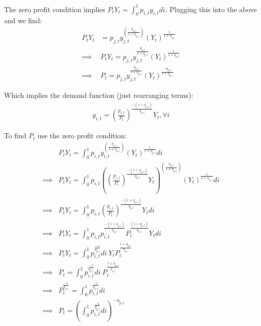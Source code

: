 \documentclass[article,11pt,letterpaper,fleqn]{article}
\theoremstyle{definition}
\numberwithin{equation}{section}
\begin{document}
The zero profit condition implies $P_{t}Y_{t}=\int_{0}^{1}p_{i,t}y_{i,t}di$.  Plugging this into the above and we find:
\begin{equation}
\begin{split}
P_{t}Y_{t} &= p_{j,t}y_{j,t}^{\left(\frac{\eta_{p,t}}{1+\eta_{p,t}}\right)}(Y_{t})^{\frac{1}{1+\eta_{p,t}}} \\
\implies &P_{t}Y_{t}=p_{j,t}y_{j,t}^{\frac{\eta_{p,t}}{1+\eta_{p,t}}}(Y_{t})^{\frac{1}{1+\eta_{p,t}}} \\
\implies & P_{t} =  p_{j,t}y_{j,t}^{\frac{\eta_{p,t}}{1+\eta_{p,t}}}(Y_{t})^{\frac{-\eta_{p,t}}{1+\eta_{p,t}}}
\end{split}
\end{equation}

Which implies the demand function (just rearranging terms):
\begin{equation}
\begin{split}
y_{i,t} =  \left(\frac{p_{i,t}}{P_{t}}\right)^{\frac{-(1+\eta_{p,t})}{\eta_{p,t}}}Y_{t}, \forall i
\end{split}
\end{equation}

To find $P_{t}$ use the zero profit condition:
\begin{equation}
\begin{split}
& P_{t}Y_{t} = \int_{0}^{1}p_{i,t}y_{i,t}^{\left(\frac{\eta_{p,t}}{1+\eta_{p,t}}\right)}(Y_{t})^{\frac{1}{1+\eta_{p,t}}}di \\
\implies & P_{t}Y_{t} = \int_{0}^{1}p_{i,t}\left(\left(\frac{p_{i,t}}{P_{t}}\right)^{\frac{-(1+\eta_{p,t})}{\eta_{p,t}}}Y_{t}\right)^{\left(\frac{\eta_{p,t}}{1+\eta_{p,t}}\right)}(Y_{t})^{\frac{1}{1+\eta_{p,t}}}di \\
\implies & P_{t}Y_{t} = \int_{0}^{1}p_{i,t}\left(\frac{p_{i,t}}{P_{t}}\right)^{\frac{-(1+\eta_{p,t})}{\eta_{p,t}}}Y_{t}di \\
\implies & P_{t}Y_{t} = \int_{0}^{1}p_{i,t}p_{i,t}^{\frac{-(1+\eta_{p,t})}{\eta_{p,t}}}P_{t}^{\frac{(1+\eta_{p,t})}{\eta_{p,t}}}Y_{t}di \\
\implies & P_{t}Y_{t} = \int_{0}^{1}p_{i,t}^{\frac{-1}{\eta_{p,t}}}di \:  Y_{t}P_{t}^{\frac{1+\eta_{p,t}}{\eta_{p,t}}} \\
\implies & P_{t} = \int_{0}^{1}p_{i,t}^{\frac{-1}{\eta_{p,t}}}di \: P_{t}^{\frac{1+\eta_{p,t}}{\eta_{p,t}}} \\
\implies & P_{t}^{\frac{-1}{\eta_{p,t}}} = \int_{0}^{1}p_{i,t}^{\frac{-1}{\eta_{p,t}}}di \\
\implies & P_{t} = \left(\int_{0}^{1}p_{i,t}^{\frac{-1}{\eta_{p,t}}}di\right)^{-\eta_{p,t}} \\
\end{split}
\end{equation}
\end{document}
